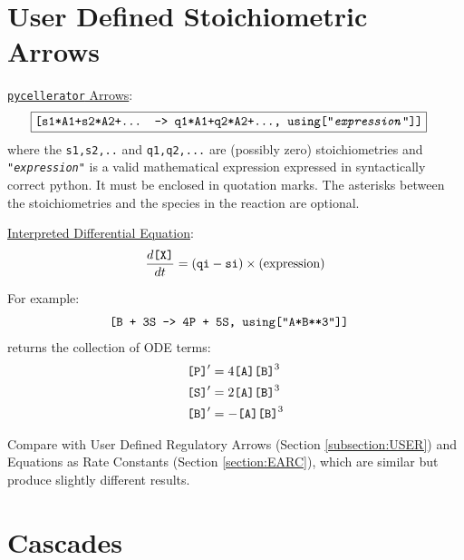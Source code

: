 \newpage

\section{User Defined Stoichiometric Arrows}
\label{section:USERST}

\underline{{\tt pycellerator} Arrows}:
\begin{align}
& \fbox{\ensuremath{\text{\tt{[s1*A1+s2*A2+... -> q1*A1+q2*A2+..., using["}}}{\tt \textit{expression}}\ensuremath{\text{\tt{"]]}}}} \label{eq:USERSTArrow1}
\end{align}
where the {\tt s1,s2,..} and {\tt q1,q2,...} are (possibly zero) stoichiometries and {\tt "\textit{expression}"} is a valid mathematical expression expressed in syntactically correct python. It must be enclosed in quotation marks. The asterisks between the stoichiometries and the species in the reaction are optional. 

\underline{Interpreted Differential Equation}:
\begin{equation}
\frac{d\text{\tt{[X]}}}{dt} = (\text{\tt{qi}}-\text{\tt{si}}) \times \text{(expression)}
\end{equation}


For example:
\begin{align*}
& {\text{\tt{[B + 3S -> 4P + 5S, using["A*B**3"]]}}} 
\end{align*}
returns the collection of ODE terms:
\begin{align*}
\text{\tt{[P]}}' &= 4\text{\tt{[A][B]}}^3\\
\text{\tt{[S]}}' &= 2\text{\tt{[A][B]}}^3\\
\text{\tt{[B]}}' &= -\text{\tt{[A][B]}}^3
\end{align*}

Compare with User Defined Regulatory Arrows (Section \ref{subsection:USER}) and Equations as Rate Constants (Section \ref{section:EARC}), which are similar but produce slightly different results. 

\newpage

\section{Cascades}

